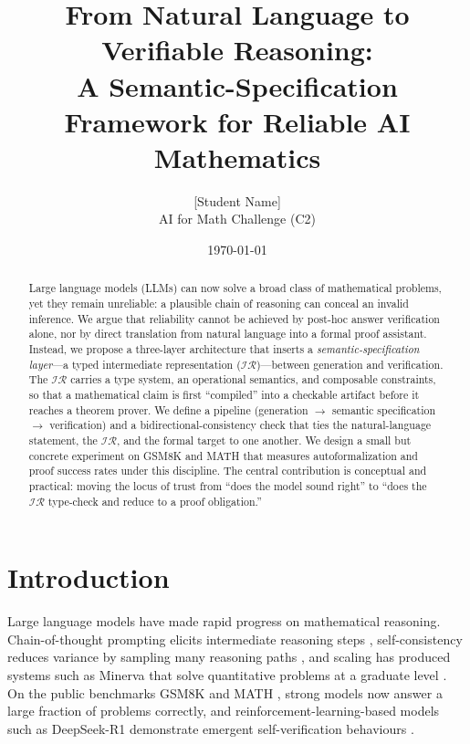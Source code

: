 \documentclass[11pt]{article}
\title{From Natural Language to Verifiable Reasoning:\\ A Semantic-Specification Framework for Reliable AI Mathematics}
\author{[Student Name]\\ \small AI for Math Challenge (C2)}
\date{\today}
\newcommand{\IR}{\ensuremath{\mathcal{IR}}}
\begin{document}
\maketitle

\begin{abstract}
Large language models (LLMs) can now solve a broad class of mathematical
problems, yet they remain unreliable: a plausible chain of reasoning can
conceal an invalid inference. We argue that reliability cannot be achieved by
post-hoc answer verification alone, nor by direct translation from natural
language into a formal proof assistant. Instead, we propose a three-layer
architecture that inserts a \emph{semantic-specification layer}---a typed
intermediate representation (\IR{})---between generation and verification. The
\IR{} carries a type system, an operational semantics, and composable
constraints, so that a mathematical claim is first ``compiled'' into a
checkable artifact before it reaches a theorem prover. We define a pipeline
(generation $\rightarrow$ semantic specification $\rightarrow$ verification)
and a bidirectional-consistency check that ties the natural-language statement,
the \IR{}, and the formal target to one another. We design a small but concrete
experiment on GSM8K and MATH that measures autoformalization and proof success
rates under this discipline. The central contribution is conceptual and
practical: moving the locus of trust from ``does the model sound right'' to
``does the \IR{} type-check and reduce to a proof obligation.''
\end{abstract}

\section{Introduction}
\label{sec:intro}

Large language models have made rapid progress on mathematical reasoning.
Chain-of-thought prompting elicits intermediate reasoning steps
\citep{wei2022chain}, self-consistency reduces variance by sampling many
reasoning paths \citep{wang2022selfconsistency}, and scaling has produced
systems such as Minerva that solve quantitative problems at a graduate level
\citep{lewkowycz2022solving}. On the public benchmarks GSM8K
\citep{cobbe2021training} and MATH \citep{hendrycks2021measuring}, strong
models now answer a large fraction of problems correctly, and
reinforcement-learning-based models such as DeepSeek-R1 demonstrate emergent
self-verification behaviours \citep{deepseek2025r1}.
\end{document}
